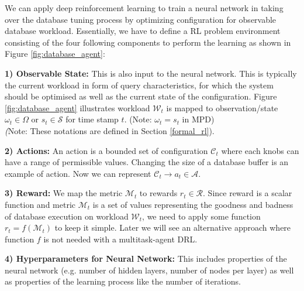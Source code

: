 We can apply deep reinforcement learning to train a neural network in taking
over the database tuning process by optimizing configuration for observable database workload.
Essentially, we have to define a RL problem environment
consisting of the four following components to perform the learning as shown in Figure \ref{fig:database_agent}:


\textbf{1) Observable State:} This is also input to the neural network. This is typically the current workload in form of
query characteristics, for which the system should be optimised as well as the current state
of the configuration. Figure \ref{fig:database_agent} illustrates workload $\mathcal{W}_t$ is mapped to observation/state $\omega_t \in \Omega$ or $s_t \in  \mathcal{S}$ for time stamp $t$. (Note: $\omega_t = s_t$ in MPD)\\
\textit(Note: These notations are defined in Section \ref{formal_rl}).

\textbf{2) Actions:} An action is a bounded set of configuration $\mathcal{C}_t$ where each knobs can have a range of permissible values.
Changing the size of a database buffer is an example of action. Now we can represent $\mathcal{C}_t  \rightarrow a_t \in \mathcal{A}$.

\textbf{3) Reward:}
We map the metric $\mathcal{M}_t$ to rewards $r_t \in \mathcal{R}$. Since reward is a scalar function and metric $\mathcal{M}_t$ is a set of values representing the goodness and badness of database execution on workload $\mathcal{W}_t$, we need to apply some function $r_t = f(\mathcal{M}_t)$ to keep it simple. Later we will see an alternative approach where function $f$ is not needed with a multitask-agent DRL.

\textbf{4) Hyperparameters for Neural Network:}
This includes properties of
the neural network (e.g. number of hidden layers, number of nodes per layer) as well as
properties of the learning process like the number of iterations.







